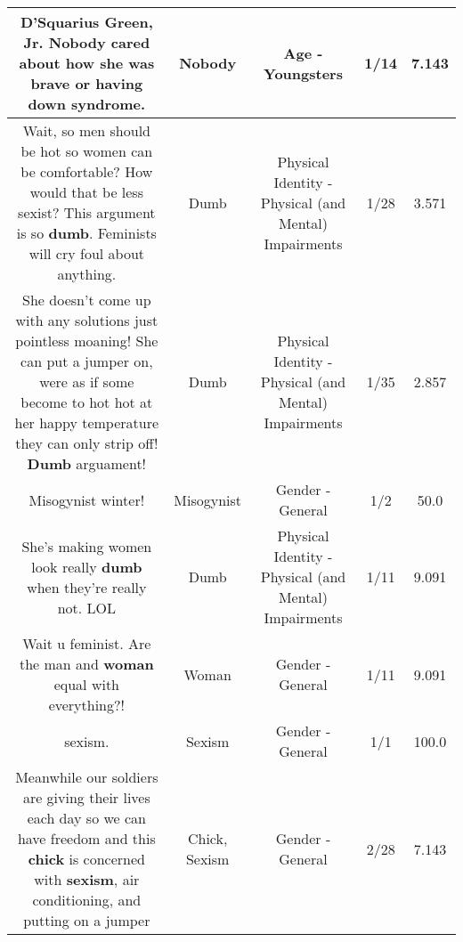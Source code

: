 \documentclass[11pt]{article}
\newlength\mylength
\begin{document}
\begin{center}
\begin{longtable}{|C{.65\mylength}|C{.30\mylength}|C{.12\mylength}|C{.12\mylength}|C{.12\mylength}|}
  \small D'Squarius Green, Jr. \textbf{Nobody} cared about how she was brave or having down syndrome.\normalsize   & Nobody & Age - Youngsters & 1/14 & 7.143 \\  \hline
  \small Wait, so men should be hot so women can be comfortable?  How would that be less sexist?  This argument is so \textbf{dumb}.  Feminists will cry foul about anything.\normalsize   & Dumb & Physical Identity - Physical (and Mental) Impairments & 1/28 & 3.571 \\  \hline
  \small She doesn't come up with any solutions just pointless moaning! She can put a jumper on, were as if some become to hot hot at her happy temperature they can only strip off! \textbf{Dumb} arguament!\normalsize   & Dumb & Physical Identity - Physical (and Mental) Impairments & 1/35 & 2.857 \\  \hline
  \small Misogynist winter!\normalsize   & Misogynist & Gender - General & 1/2 & 50.0 \\  \hline
  \small She's making women look really \textbf{dumb} when they're really not. LOL\normalsize   & Dumb & Physical Identity - Physical (and Mental) Impairments & 1/11 & 9.091 \\  \hline
  \small Wait u feminist. Are the man and \textbf{woman} equal with everything?!\normalsize   & Woman & Gender - General & 1/11 & 9.091 \\  \hline
  \small sexism.\normalsize   & Sexism & Gender - General & 1/1 & 100.0 \\  \hline
  \small Meanwhile our soldiers are giving their lives each day so we can have freedom and this \textbf{chick} is concerned with \textbf{sexism}, air conditioning, and putting on a jumper\normalsize   & Chick, Sexism & Gender - General & 2/28 & 7.143 \\  \hline

\end{longtable}
\end{center}
\end{document}

